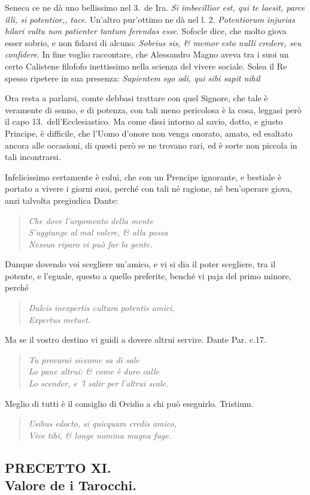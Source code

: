 \documentclass[11pt,a6paper]{article}
\newcommand{\literaryquote}[1]{%
\kern -6pt  \begin{verse}
    {\footnotesize \it #1}
  \end{verse}\kern -2pt%
}
\begin{document}
{Seneca ce ne dà uno bellissimo nel 3.\ de Ira.
\textit{Si imbecillior est, qui te laesit, parce illi, si potentior,,
 tace}. Un'altro pur'ottimo ne dà nel l. 2. \textit{
 Potentiorum injurias hilari vultu non patienter tantum ferendas
 esse}. Sofocle dice, che molto giova esser
sobrio, e non fidarsi di alcuno: \textit{Sobrius sis, \& memor
 esto nulli credere, seu confidere}. In fine voglio
raccontare, che Alessandro Magno aveva tra i suoi
un certo Calistene filofofo inettissimo nella scienza
del vivere sociale. Solea il Re spesso ripetere in sua
presenza: \textit{Sapientem ego odi, qui sibi sapit nihil}

Ora resta a parlarsi, comte debbasi trattare con
quel Signore, che tale è veramente di senno, e di
potenza, con tali meno pericolosa è la cosa, leggasi
però il capo 13.\ dell'Ecclesiastico. Ma come dissi
intorno al savio, dotto, e giusto Principe, è difficile,
che l'Uomo d'onore non venga onorato, amato,
ed esaltato ancora alle occasioni, di questi però se ne
trovano rari, ed è sorte non piccola in tali incontrarsi.

Infelicissimo certamente è colui, che con un
Prencipe ignorante, e bestiale è portato a vivere i
giorni suoi, perché con tali né ragione, né ben'operare
giova, anzi talvolta pregiudica Dante:
\literaryquote{
Che dove l'argomento della mente \\
S'aggiunge al mal volere, \& alla possa\\
Nessun riparo vi può far la gente.}

Dunque dovendo voi scegliere un'amico, e vi si dia
il poter scegliere, tra il potente, e l'eguale, questo
a quello preferite, benché vi paja del primo minore, perché
\literaryquote{
Dulcis inexpertis cultura potentis amici, \\
Expertus metuet.}

Ma se il vostro destino vi guidi a dovere altrui servire.
Dante Par. c.17.
\literaryquote{
Tu provarai siccome sa di sale\\
Lo pane altrui: \& come è duro calle\\
Lo scender, e 'l salir per l'altrui scale.}

Meglio di tutti è il consiglio di Ovidio a chi può eseguirlo.
Tristium.
\literaryquote{
Usibus edocto, si quicquam credis amico, \\
Vive tibi, \& longe nomina magna fuge.}
}

\clearpage
\subsection{PRECETTO XI.\\
 \footnotesize Valore de i Tarocchi.}
\end{document}
